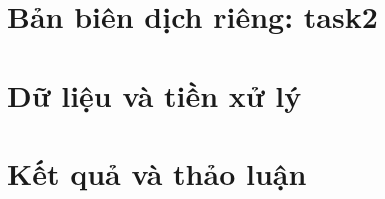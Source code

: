 \documentclass[13pt,a4paper,oneside]{extreport}
\begin{document}
\chapter*{Bản biên dịch riêng: task2}
\chapter{Dữ liệu và tiền xử lý}

\chapter{Kết quả và thảo luận}

\printbibliography
\end{document}
